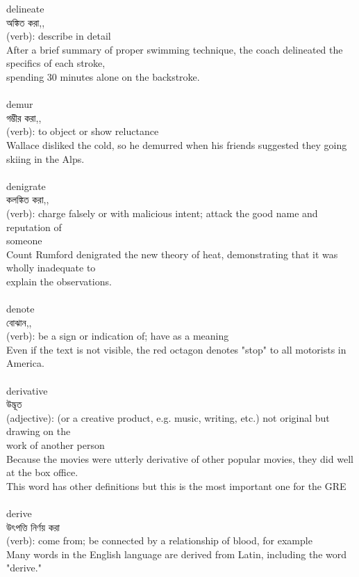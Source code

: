 \documentclass{article}
\begin{document}
{delineate}\\
{অঙ্কিত করা,,}\\
{(verb): describe in detail\\After a brief summary of proper swimming technique, the coach delineated the specifics of each stroke,\\spending 30 minutes alone on the backstroke.\\}\\
{demur}\\
{গম্ভীর করা,,}\\
{(verb): to object or show reluctance\\Wallace disliked the cold, so he demurred when his friends suggested they going skiing in the Alps.\\}\\
{denigrate}\\
{কলঙ্কিত করা,,}\\
{(verb): charge falsely or with malicious intent; attack the good name and reputation of\\someone\\Count Rumford denigrated the new theory of heat, demonstrating that it was wholly inadequate to\\explain the observations.\\}\\
{denote}\\
{বোঝান,,}\\
{(verb): be a sign or indication of; have as a meaning\\Even if the text is not visible, the red octagon denotes "stop" to all motorists in America.\\}\\
{derivative}\\
{উদ্ভূত}\\
{(adjective): (or a creative product, e.g. music, writing, etc.) not original but drawing on the\\work of another person\\Because the movies were utterly derivative of other popular movies, they did well at the box office.\\This word has other definitions but this is the most important one for the GRE\\}\\
{derive}\\
{উৎপত্তি নির্ণয় করা}\\
{(verb): come from; be connected by a relationship of blood, for example\\Many words in the English language are derived from Latin, including the word "derive."\\}\\
\end{document}
